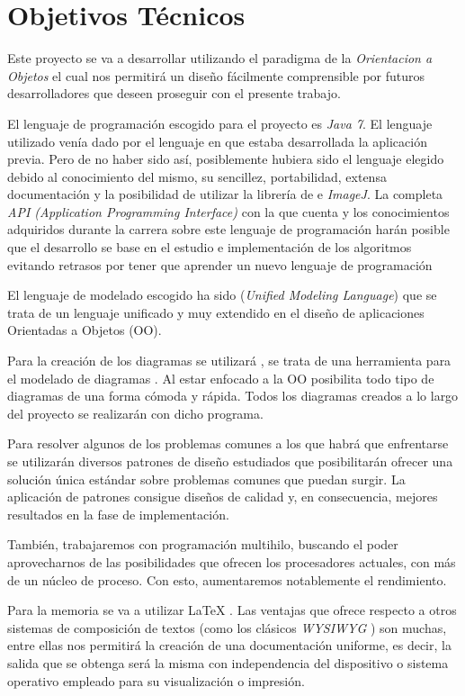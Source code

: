 \section{Objetivos Técnicos}
Este proyecto se va a desarrollar utilizando el paradigma de la \textit{Orientacion a Objetos} el cual nos permitirá un diseño fácilmente comprensible por futuros desarrolladores que deseen proseguir con el presente trabajo. 

El lenguaje de programación escogido para el proyecto es \textit{Java 7}. El lenguaje utilizado venía dado por el lenguaje en que estaba desarrollada la aplicación previa. Pero de no haber sido así, posiblemente hubiera sido el lenguaje elegido debido al conocimiento del mismo, su sencillez, portabilidad, extensa documentación y la posibilidad de utilizar la librería de \weka{} e \textit{ImageJ}. La completa \textit{API (Application Programming Interface)} con la que cuenta y los conocimientos adquiridos durante la carrera sobre este lenguaje de programación harán posible que el desarrollo se base en el estudio e implementación de los algoritmos evitando retrasos por tener que aprender un nuevo lenguaje de programación

El lenguaje de modelado escogido ha sido \uml{} (\textit{Unified Modeling Language}) que se trata de un lenguaje unificado y muy extendido en el diseño de aplicaciones Orientadas a Objetos (OO).

Para la creación de los diagramas se utilizará \jude{}, se trata de una herramienta para el modelado de diagramas \uml{}. Al estar enfocado a la OO posibilita todo tipo de diagramas de una forma cómoda y rápida. Todos los diagramas creados a lo largo del proyecto se realizarán con dicho programa.

Para resolver algunos de los problemas comunes a los que habrá que enfrentarse se utilizarán diversos patrones de diseño \cite{patrones} estudiados que posibilitarán ofrecer una solución única estándar sobre problemas comunes que puedan surgir. La aplicación de patrones consigue diseños de calidad y, en consecuencia, mejores resultados en la fase de implementación.

También, trabajaremos con programación multihilo, buscando el poder aprovecharnos de las posibilidades que ofrecen los procesadores actuales, con más de un núcleo de proceso. Con esto, aumentaremos notablemente el rendimiento.

Para la memoria se va a utilizar \LaTeX{} . Las ventajas que ofrece respecto a otros sistemas de composición de textos (como los clásicos \textit{WYSIWYG} ) son muchas, entre ellas nos permitirá la creación de una documentación uniforme, es decir, la salida que se obtenga será la misma con independencia del dispositivo o sistema operativo empleado para su visualización o impresión.

